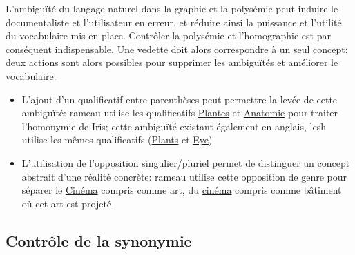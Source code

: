 L'ambiguïté du langage naturel dans la graphie et la polysémie peut induire le documentaliste et l'utilisateur en erreur, et réduire ainsi la puissance et l'utilité du vocabulaire mis en place. Contrôler la polysémie et l'homographie est par conséquent indispensable. Une vedette doit alors correspondre à un seul concept: deux actions sont alors possibles pour supprimer les ambiguïtés et améliorer le vocabulaire.
\begin{itemize}
	\item L'ajout d'un qualificatif entre parenthèses peut permettre la levée de cette ambiguïté: \ac{rameau} utilise les qualificatifs \og \href{https://data.bnf.fr/fr/11935557/iris__plantes_/}{Plantes}\fg{} et \og\href{https://data.bnf.fr/fr/11938389/iris__anatomie_/}{Anatomie}\fg{} pour traiter l'homonymie de \og Iris\fg{}; cette ambiguïté existant également en anglais, \ac{lcsh} utilise les mêmes qualificatifs (\og \href{https://id.loc.gov/authorities/subjects/sh85068079.html}{Plants}\fg{} et \og\href{https://id.loc.gov/authorities/subjects/sh85068076.html}{Eye}\fg{})
	\item L'utilisation de l'opposition singulier/pluriel permet de distinguer un concept abstrait d'une réalité concrète: \ac{rameau} utilise cette opposition de genre pour séparer le \og \href{https://data.bnf.fr/fr/11936118/cinema/}{Cinéma}\fg{} compris comme art, du \og \href{https://data.bnf.fr/fr/11939426/cinemas/}{cinéma}\fg{} compris comme bâtiment où cet art est projeté
\end{itemize}

\subsection{\label{I-A-2-c}Contrôle de la synonymie}

